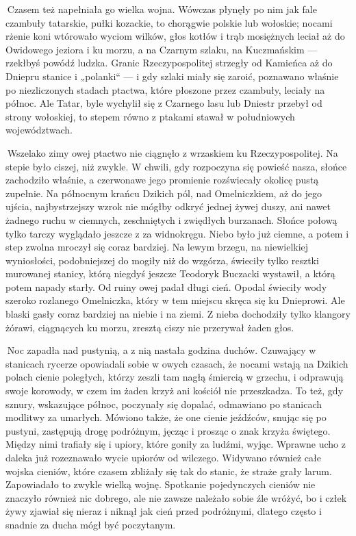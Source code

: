  Czasem też napełniała go wielka wojna. Wówczas płynęły po nim jak fale czambuły tatarskie, pułki kozackie, to chorągwie polskie lub wołoskie; nocami rżenie koni wtórowało wyciom wilków, głos kotłów i trąb mosiężnych leciał aż do Owidowego jeziora i ku morzu, a na Czarnym szlaku, na Kuczmańskim — rzekłbyś powódź ludzka. Granic Rzeczypospolitej strzegły od Kamieńca aż do Dniepru stanice i „polanki“ — i gdy szlaki miały się zaroić, poznawano właśnie po niezliczonych stadach ptactwa, które płoszone przez czambuły, leciały na północ. Ale Tatar, byle wychylił się z Czarnego lasu lub Dniestr przebył od strony wołoskiej, to stepem równo z ptakami stawał w południowych województwach.

 Wszelako zimy owej ptactwo nie ciągnęło z wrzaskiem ku Rzeczypospolitej. Na stepie było ciszej, niż zwykle. W chwili, gdy rozpoczyna się powieść nasza, słońce zachodziło właśnie, a czerwonawe jego promienie rozświecały okolicę pustą zupełnie. Na północnym krańcu Dzikich pól, nad Omelniczkiem, aż do jego ujścia, najbystrzejszy wzrok nie mógłby odkryć jednej żywej duszy, ani nawet żadnego ruchu w ciemnych, zeschniętych i zwiędłych burzanach. Słońce połową tylko tarczy wyglądało jeszcze z za widnokręgu. Niebo było już ciemne, a potem i step zwolna mroczył się coraz bardziej. Na lewym brzegu, na niewielkiej wyniosłości, podobniejszej do mogiły niż do wzgórza, świeciły tylko resztki murowanej stanicy, którą niegdyś jeszcze Teodoryk Buczacki wystawił, a którą potem napady starły. Od ruiny owej padał długi cień. Opodal świeciły wody szeroko rozlanego Omelniczka, który w tem miejscu skręca się ku Dnieprowi. Ale blaski gasły coraz bardziej na niebie i na ziemi. Z nieba dochodziły tylko klangory żórawi, ciągnących ku morzu, zresztą ciszy nie przerywał żaden głos.

 Noc zapadła nad pustynią, a z nią nastała godzina duchów. Czuwający w stanicach rycerze opowiadali sobie w owych czasach, że nocami wstają na Dzikich polach cienie poległych, którzy zeszli tam nagłą śmiercią w grzechu, i odprawują swoje korowody, w czem im żaden krzyż ani kościół nie przeszkadza. To też, gdy sznury, wskazujące północ, poczynały się dopalać, odmawiano po stanicach modlitwy za umarłych. Mówiono także, że one cienie jeźdźców, snując się po pustyni, zastępują drogę podróżnym, jęcząc i prosząc o znak krzyża świętego. Między nimi trafiały się i upiory, które goniły za ludźmi, wyjąc. Wprawne ucho z daleka już rozeznawało wycie upiorów od wilczego. Widywano również całe wojska cieniów, które czasem zbliżały się tak do stanic, że straże grały larum. Zapowiadało to zwykle wielką wojnę. Spotkanie pojedynczych cieniów nie znaczyło również nic dobrego, ale nie zawsze należało sobie źle wróżyć, bo i człek żywy zjawiał się nieraz i niknął jak cień przed podróżnymi, dlatego często i snadnie za ducha mógł być poczytanym.

